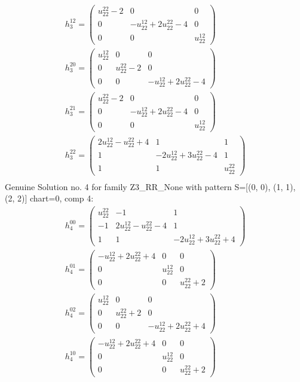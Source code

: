 \documentclass[a4paper, 11pt, twoside, onecolumn]{article}
\begin{document}
\begin{landscape}
\begin{gather*}
	 h_3^{12}=\begin{pmatrix}u^{22}_{22} - 2 & 0 & 0\\0 & - u^{12}_{22} + 2 u^{22}_{22} - 4 & 0\\0 & 0 & u^{12}_{22}\end{pmatrix}\\ 
	 h_3^{20}=\begin{pmatrix}u^{12}_{22} & 0 & 0\\0 & u^{22}_{22} - 2 & 0\\0 & 0 & - u^{12}_{22} + 2 u^{22}_{22} - 4\end{pmatrix}\\ 
	 h_3^{21}=\begin{pmatrix}u^{22}_{22} - 2 & 0 & 0\\0 & - u^{12}_{22} + 2 u^{22}_{22} - 4 & 0\\0 & 0 & u^{12}_{22}\end{pmatrix}\\ 
	 h_3^{22}=\begin{pmatrix}2 u^{12}_{22} - u^{22}_{22} + 4 & 1 & 1\\1 & - 2 u^{12}_{22} + 3 u^{22}_{22} - 4 & 1\\1 & 1 & u^{22}_{22}\end{pmatrix}\\ 
\end{gather*} 
Genuine Solution no. 4 for family Z3_RR_None with pattern S=[(0, 0), (1, 1), (2, 2)] chart=0, comp 4: 
\begin{gather*} 
	 h_4^{00}=\begin{pmatrix}u^{22}_{22} & -1 & 1\\-1 & 2 u^{12}_{22} - u^{22}_{22} - 4 & 1\\1 & 1 & - 2 u^{12}_{22} + 3 u^{22}_{22} + 4\end{pmatrix}\\ 
	 h_4^{01}=\begin{pmatrix}- u^{12}_{22} + 2 u^{22}_{22} + 4 & 0 & 0\\0 & u^{12}_{22} & 0\\0 & 0 & u^{22}_{22} + 2\end{pmatrix}\\ 
	 h_4^{02}=\begin{pmatrix}u^{12}_{22} & 0 & 0\\0 & u^{22}_{22} + 2 & 0\\0 & 0 & - u^{12}_{22} + 2 u^{22}_{22} + 4\end{pmatrix}\\ 
	 h_4^{10}=\begin{pmatrix}- u^{12}_{22} + 2 u^{22}_{22} + 4 & 0 & 0\\0 & u^{12}_{22} & 0\\0 & 0 & u^{22}_{22} + 2\end{pmatrix}\\ 

\end{gather*}
\end{landscape}
\end{document}
